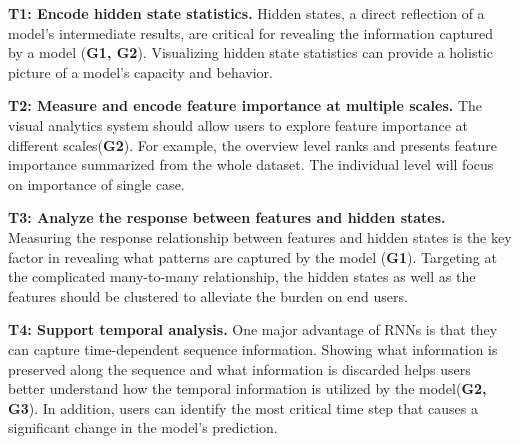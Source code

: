 \textbf{T1: Encode hidden state statistics.}
Hidden states, a direct reflection of a model's intermediate results, are critical for revealing the information captured by a model (\textbf{G1, G2}).
Visualizing hidden state statistics can provide a holistic picture of a model's capacity and behavior.

\textbf{T2: Measure and encode feature importance at multiple scales.}
The visual analytics system should allow users to explore feature importance at different scales(\textbf{G2}). 
For example, the overview level ranks and presents feature importance summarized from the whole dataset. The individual level will focus on importance of single case.


\textbf{T3: Analyze the response between features and hidden states.}
Measuring the response relationship between features and hidden states is the key factor in revealing what patterns are captured by the model (\textbf{G1}). 
Targeting at the complicated many-to-many relationship, the hidden states as well as the features should be clustered to alleviate the burden on end users. 


\textbf{T4: Support temporal analysis.}
One major advantage of RNNs is that they can capture time-dependent sequence information.
Showing what information is preserved along the sequence and what information is discarded helps users better understand how the temporal information is utilized by the model(\textbf{G2, G3}).
In addition, users can identify the most critical time step that causes a significant change in the model's prediction.

